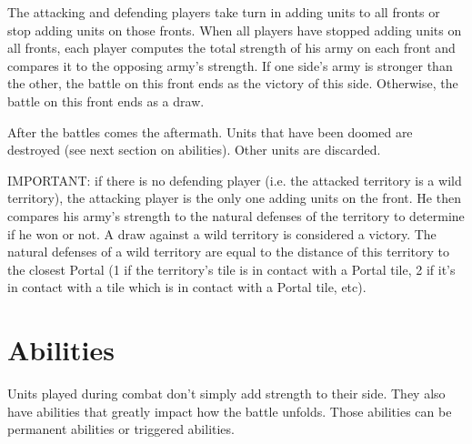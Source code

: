 \documentclass[a4paper]{article}
\begin{document}
    The attacking and defending players take turn in adding units to all fronts or stop adding units on those fronts.
    When all players have stopped adding units on all fronts, each player computes the total strength of his army on
    each front and compares it to the opposing army's strength.
    If one side's army is stronger than the other, the battle on this front ends as the victory of this side.
    Otherwise, the battle on this front ends as a draw.
    
    After the battles comes the aftermath.
    Units that have been doomed are destroyed (see next section on abilities).
    Other units are discarded.
    
    IMPORTANT: if there is no defending player (i.e. the attacked territory is a wild territory),
        the attacking player is the only one adding units on the front.
        He then compares his army's strength to the natural defenses of the territory to determine if he won or not.
        A draw against a wild territory is considered a victory.
        The natural defenses of a wild territory are equal to the distance of this territory to the closest Portal
        (1 if the territory's tile is in contact with a Portal tile, 2 if it's in contact with a tile which is in contact with a Portal tile, etc).



\section{Abilities}

    Units played during combat don't simply add strength to their side.
    They also have abilities that greatly impact how the battle unfolds.
    Those abilities can be permanent abilities or triggered abilities.
\end{document}
